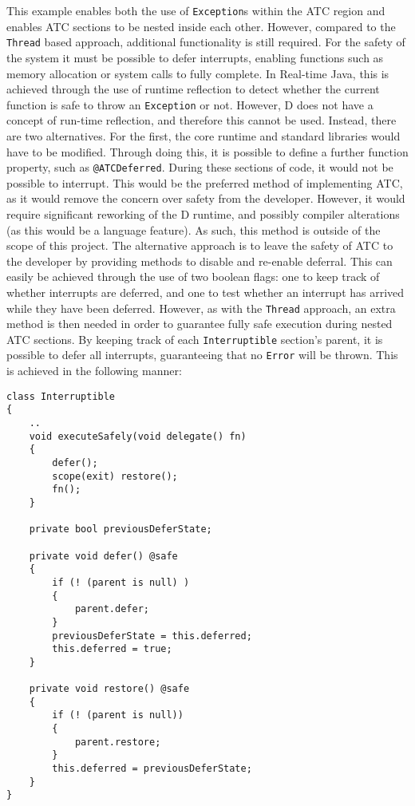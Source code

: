 This example enables both the use of \texttt{Exception}s within the ATC region and
enables ATC sections to be nested inside each other. However, compared to the
\texttt{Thread} based approach, additional functionality is still required. 
For the safety of the system it must be possible to defer interrupts, enabling 
functions such as memory allocation or system calls to fully complete. In
Real-time Java, this is achieved through the use of runtime reflection to detect
whether the current function is safe to throw an \texttt{Exception} or not.
However, D does not have a concept of run-time reflection, and therefore this cannot be
used. 
Instead, there are two alternatives. For the first, the core runtime and standard
libraries would have to be modified. Through doing this, it is possible to
define a further function property, such as \texttt{@ATCDeferred}.  During these
sections of code, it would not be possible to interrupt. This
would be the preferred method of implementing ATC, as it would remove the
concern over safety from the developer. However, it would require significant
reworking of the D runtime, and possibly compiler alterations (as this would be
a language feature). As such, this method is outside of the scope of this
project. 
The alternative approach is to leave the safety of ATC to the developer by
providing methods to disable and re-enable deferral.
This can easily be achieved through the use of two boolean flags: one to keep track
of whether interrupts are deferred, and one to test whether an interrupt has
arrived while they have been deferred. 
However, as with the \texttt{Thread} approach, an extra method is then needed in 
order to guarantee fully safe execution during nested ATC sections. By keeping
track of each \texttt{Interruptible} section's parent, it is possible to defer
all interrupts, guaranteeing that no \texttt{Error} will be thrown. This is
achieved in the following manner: 
\begin{lstlisting}[basicstyle=\small]
class Interruptible
{
    ..
    void executeSafely(void delegate() fn) 
    {
        defer();
        scope(exit) restore();
        fn();
    }

    private bool previousDeferState;

    private void defer() @safe
    {
        if (! (parent is null) )
        {
            parent.defer;
        }
        previousDeferState = this.deferred;
        this.deferred = true;
    }

    private void restore() @safe
    {
        if (! (parent is null))
        {
            parent.restore;
        }
        this.deferred = previousDeferState;
    }
}
\end{lstlisting}
